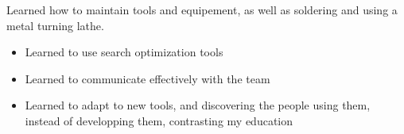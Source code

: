 \documentclass[a4paper,12pt]{memoir} %
\begin{document}
{
	Learned how to maintain tools and equipement, as well as soldering and using a metal 
	turning lathe.
}


{
	\begin{itemize}
		\item{Learned to use search optimization tools}
		\item{Learned to communicate effectively with the team}
		\item{
				Learned to adapt to new tools, and discovering the people using them, instead
				of developping them, contrasting my education
		}
	\end{itemize}
}


%
%
%
%
%
%
%

\Sep %




\end{document}

